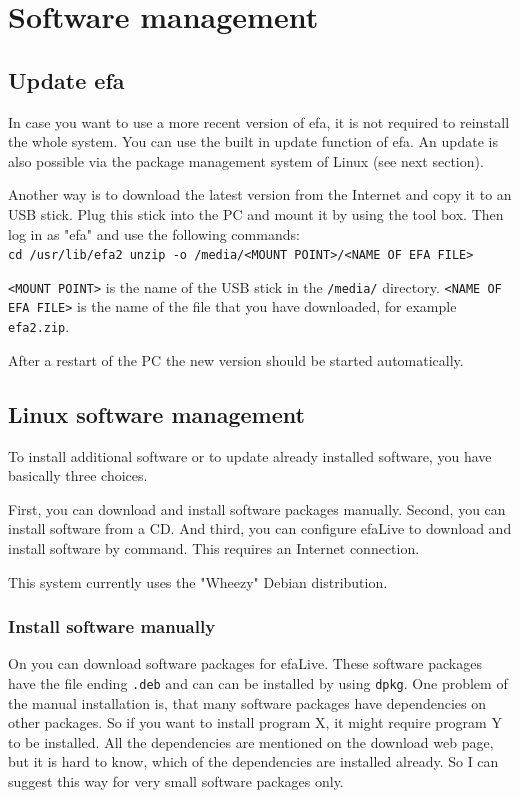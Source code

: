 \documentclass[a4paper,12pt,twoside]{article}
\begin{document}
\section{Software management}
\label{sct:software_management}
\subsection{Update efa}
\label{sct:update_efa}
In case you want to use a more recent version of efa, it is not required
to reinstall the whole system. You can use the built in update function
of efa. An update is also possible via the package management system of Linux
(see next section).

Another way is to download the latest version from the Internet
\cite{EFA1} and copy it to an USB stick. Plug this stick into the PC
and mount it by using the tool box. Then log in as
"efa" and use the following commands:
\bigskip
\\
\texttt{cd /usr/lib/efa2
unzip -o /media/{\textless}MOUNT POINT{\textgreater}/{\textless}NAME OF
EFA FILE{\textgreater}}

\bigskip
\texttt{{\textless}MOUNT POINT{\textgreater}} is the name of the USB stick in the
\texttt{/media/} directory. \texttt{{\textless}NAME OF EFA FILE{\textgreater}} is the
name of the file that you have downloaded, for example
\texttt{efa2.zip}.

After a restart of the PC the new version should be started
automatically.


\subsection{Linux software management}
\label{sct:linux_software}
To install additional software or to update already installed software,
you have basically three choices.

First, you can download and install software packages manually. Second,
you can install software from a CD. And third, you can configure
efaLive to download and install software by command. This requires an
Internet connection.

This system currently uses the "Wheezy" Debian distribution.


\subsubsection{Install software manually}
\label{sct:software_manually}
On \cite{DEB3} you can download software packages for efaLive. These
software packages have the file ending
\texttt{.deb} and can can be installed by using
\texttt{dpkg}. One problem of the manual
installation is, that many software packages have dependencies on other
packages. So if you want to install program X, it might require program
Y to be installed. All the dependencies are mentioned on the download
web page, but it is hard to know, which of the dependencies are
installed already. So I can suggest this way for very small software
packages only.
\end{document}
